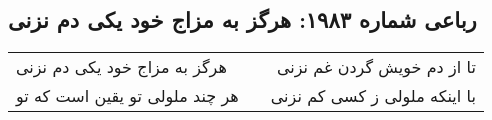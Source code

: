 \begin{center}
\section*{رباعی شماره ۱۹۸۳: هرگز به مزاج خود یکی دم نزنی}
\label{sec:1983}
\begin{longtable}{l p{0.5cm} r}
هرگز به مزاج خود یکی دم نزنی
&&
تا از دم خویش گردن غم نزنی
\\
هر چند ملولی تو یقین است که تو
&&
با اینکه ملولی ز کسی کم نزنی
\\
\end{longtable}
\end{center}
